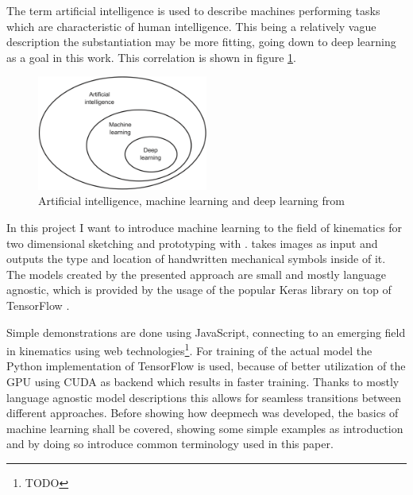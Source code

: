 The term artificial intelligence is used to describe machines performing tasks which are characteristic of human intelligence.
This being a relatively vague description the substantiation may be more fitting, going down to deep learning as a goal in this work.
This correlation is shown in figure \ref{fig:ai_ml_dl}.

\begin{figure}
    \includegraphics[width=0.5\textwidth]{images/ai_ml_dl.png}
    \caption{Artificial intelligence, machine learning and deep learning from \cite[p.4]{Chollet2017}}
    \label{fig:ai_ml_dl}
\end{figure}

In this project I want to introduce machine learning to the field of kinematics for two dimensional sketching and prototyping with .
 takes images as input and outputs the type and location of
handwritten mechanical symbols inside of it. %
The models created by the presented approach are small and mostly language agnostic, which is provided by the usage of the popular Keras \cite{Chollet} library on top of TensorFlow \cite{Google}.

Simple demonstrations are done using JavaScript, connecting to an emerging field in kinematics using web technologies\footnote{ TODO }.
For training of the actual model the Python implementation of TensorFlow is used, because of better utilization of the GPU using CUDA \cite{nvidia2019} as backend which results in faster training.
Thanks to mostly language agnostic model descriptions this allows for seamless transitions between different approaches.
Before showing how deepmech was developed, the basics of machine learning shall be covered, showing some simple examples as introduction and by doing so introduce common terminology used in this paper.
